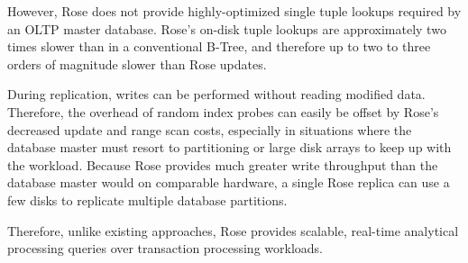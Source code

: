 \documentclass{vldb}
\newcommand{\rows}{Rose\xspace}
\newcommand{\rowss}{Rose's\xspace}
\begin{document}
However, \rows does not provide highly-optimized single tuple lookups
required by an OLTP master database.  \rowss on-disk tuple lookups are
approximately two times slower than in a conventional B-Tree, and therefore
up to two to three orders of magnitude slower than \rows updates.

During replication, writes can be performed without reading modified data.  Therefore, the overhead of random index probes can easily be offset by
\rowss decreased update and range scan costs, especially in situations where the
database master must resort to partitioning or large disk arrays to
keep up with the workload.  Because \rows provides much greater write
throughput than the database master would on comparable hardware, a
single \rows replica can use a few disks to replicate
multiple database partitions.

Therefore, unlike existing approaches, \rows provides scalable,
real-time analytical processing queries over transaction processing
workloads.




\end{document}
